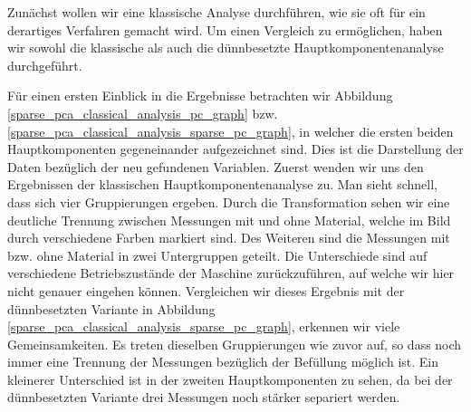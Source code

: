 Zunächst wollen wir eine klassische Analyse durchführen, wie sie oft für ein derartiges Verfahren gemacht wird. Um einen Vergleich zu ermöglichen, haben wir sowohl die klassische als auch die dünnbesetzte Hauptkomponentenanalyse durchgeführt. 

Für einen ersten Einblick in die Ergebnisse betrachten wir Abbildung \ref{sparse_pca_classical_analysis_pc_graph} bzw. \ref{sparse_pca_classical_analysis_sparse_pc_graph}, in welcher die ersten beiden Hauptkomponenten gegeneinander aufgezeichnet sind. Dies ist die Darstellung der Daten bezüglich der neu gefundenen Variablen. Zuerst wenden wir uns den Ergebnissen der klassischen Hauptkomponentenanalyse zu. Man sieht schnell, dass sich vier Gruppierungen ergeben. Durch die Transformation sehen wir eine deutliche Trennung zwischen Messungen mit und ohne Material, welche im Bild durch verschiedene Farben markiert sind. Des Weiteren sind die Messungen mit bzw. ohne Material in zwei Untergruppen geteilt. Die Unterschiede sind auf verschiedene Betriebszustände der Maschine zurückzuführen, auf welche wir hier nicht genauer eingehen können. Vergleichen wir dieses Ergebnis mit der dünnbesetzten Variante in Abbildung \ref{sparse_pca_classical_analysis_sparse_pc_graph}, erkennen wir viele Gemeinsamkeiten. Es treten dieselben Gruppierungen wie zuvor auf, so dass noch immer eine Trennung der Messungen bezüglich der Befüllung möglich ist. Ein kleinerer Unterschied ist in der zweiten Hauptkomponenten zu sehen, da bei der dünnbesetzten Variante drei Messungen noch stärker separiert werden.

